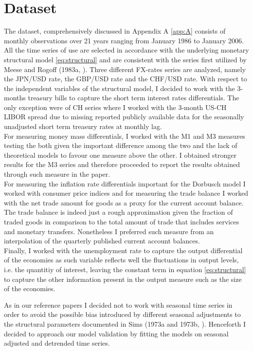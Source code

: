 \section{Dataset} \label{sec:dataset}

The dataset, comprehensively discussed in Appendix A \ref{app:A}
consists of monthly observations over 21 years ranging from January
1986 to January 2006.  All the time series of use are selected in
accordance with the underlying monetary structural model
\ref{eq:structural} and are consistent with the series first utilized
by Meese and Rogoff (1983a, \cite{MeeseRogoffa}). Three different
FX-rates series are analyzed, namely the JPN/USD rate, the GBP/USD
rate and the CHF/USD rate.  With respect to the independent variables
of the structural model, I decided to work with the 3-months treasury
bills to capture the short term interest rates differentials. The only
exception were of CH series where I worked with the 3-month US-CH
LIBOR spread due to missing reported publicly available data for the
seasonally unadjusted short term treasury rates at monthly lag.  \\
For measuring money mass differentials, I worked with the M1 and M3
measures testing the both given the important difference among the two
and the lack of theoretical models to favour one measure above the
other. I obtained stronger results for the M3 series and therefore
proceeded to report the results obtained through such measure in the
paper. \\ For measuring the inflation rate differentials important for
the Dorbusch model I worked with consumer price indices and for
measuring the trade balance I worked with the net trade amount for
goods as a proxy for the current account balance.  The trade balance
is indeed just a rough approximation given the fraction of traded
goods in comparison to the total amount of trade that includes
services and monetary transfers. Nonetheless I preferred such measure
from an interpolation of the quarterly published current account balances. \\
Finally, I worked with the unemployment rate to capture the output
differential of the economies as such variable reflects
well the fluctuations in output levels, i.e. the quantitiy of
interest, leaving the constant term in equation \ref{eq:structural} to
capture the other information present in the output measure such as
the size of the economies.

As in our reference papers I decided not to work with seasonal time
series in order to avoid the possible bias introduced by different
seasonal adjustments to the structural parameters documented in Sims
(1973a and 1973b, \cite{Simsa, Simsb}).  Henceforth I decided to
approach our model validation by fitting the models on seasonal
adjusted and detrended time series.


